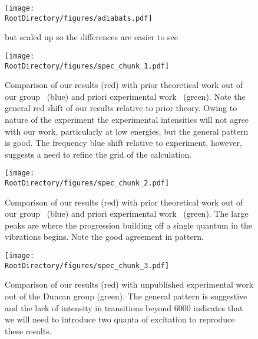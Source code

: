 %
%

\newpage
\begin{figure}[ht]
\begin{center}
    \texttt{[image: \\RootDirectory/figures/adiabats.pdf]}
    \caption{
     but scaled up so the differences are easier to see
}
\label{fig:adiabat_cuts_big}
\end{center}
\end{figure}


\begin{figure}[ht]
\begin{center}
    \texttt{[image: \\RootDirectory/figures/spec\_chunk\_1.pdf]}
    \caption{
    Comparison of our results (red) with prior theoretical work out of our group~\cite{Lin2012} (blue) and priori experimental work~\cite{Cheng2012} (green). Note the general red shift of our results relative to prior theory. Owing to nature of the experiment the experimental intensities will not agree with our work, particularly at low energies, but the general pattern is good. The frequency blue shift relative to experiment, however, suggests a need to refine the grid of the calculation. \CHECK
}
\label{fig:spec_chunk_1}
\end{center}
\end{figure}

\begin{figure}[ht]
\begin{center}
    \texttt{[image: \\RootDirectory/figures/spec\_chunk\_2.pdf]}
    \caption{
    Comparison of our results (red) with prior theoretical work out of our group~\cite{Lin2012} (blue) and priori experimental work~\cite{Cheng2012} (green). The large peaks are where the \hplus{} progression building off a single quantum in the \htwo{} vibrations begins. Note the good agreement in pattern.
}
\label{fig:spec_chunk_2}
\end{center}
\end{figure}

\begin{figure}[ht]
\begin{center}
    \texttt{[image: \\RootDirectory/figures/spec\_chunk\_3.pdf]}
    \caption{
    Comparison of our results (red) with unpublished experimental work out of the Duncan group (green). The general pattern is suggestive and the lack of intensity in transitions beyond $6000$ \wavenumbers{} indicates that we will need to introduce two quanta of \htwo{} excitation to reproduce these results.
}
\label{fig:spec_chunk_3}
\end{center}
\end{figure}

